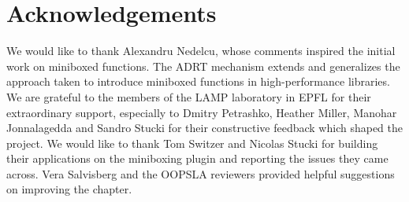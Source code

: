 
\section*{Acknowledgements}


We would like to thank Alexandru Nedelcu, whose comments inspired the initial work on miniboxed functions. The ADRT mechanism extends and generalizes the approach taken to introduce miniboxed functions in high-performance libraries. We are grateful to the members of the LAMP laboratory in EPFL for their extraordinary support, especially to Dmitry Petrashko, Heather Miller, Manohar Jonnalagedda and Sandro Stucki for their constructive feedback which shaped the project. We would like to thank Tom Switzer and Nicolas Stucki for building their applications on the miniboxing plugin and reporting the issues they came across. Vera Salvisberg and the OOPSLA reviewers provided helpful suggestions on improving the chapter.
